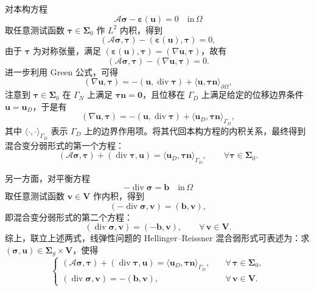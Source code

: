 对本构方程
\[
\mathcal{A}\boldsymbol{\sigma} - \boldsymbol{\varepsilon}(\boldsymbol{u}) = 0\quad\text{in}\,\Omega
\]
取任意测试函数 $\boldsymbol{\tau}\in\boldsymbol{\Sigma}_0$ 作 $L^2$ 内积，得到
\[
(\mathcal{A}\boldsymbol{\sigma},\boldsymbol{\tau}) - (\boldsymbol{\varepsilon}(\boldsymbol{u}),\boldsymbol{\tau}) = 0,
\]
由于 $\boldsymbol{\tau}$ 为对称张量，满足 $(\boldsymbol{\varepsilon}(\boldsymbol{u}),\boldsymbol{\tau}) = (\nabla\boldsymbol{u},\boldsymbol{\tau})$，故有
\[
(\mathcal{A}\boldsymbol{\sigma},\boldsymbol{\tau}) - (\nabla\boldsymbol{u},\boldsymbol{\tau}) = 0.
\]
进一步利用 Green 公式，可得
\[
(\nabla\boldsymbol{u},\boldsymbol{\tau}) = -(\boldsymbol{u},\operatorname{div}\boldsymbol{\tau}) + \langle\boldsymbol{u},\boldsymbol{\tau}\boldsymbol{n}\rangle_{\partial\Omega},
\]
注意到 $\boldsymbol{\tau}\in\boldsymbol{\Sigma}_{0}$ 在 $\Gamma_{N}$ 上满足 $\boldsymbol{\tau}\boldsymbol{n} = \boldsymbol{0}$，且位移在 $\Gamma_D$ 上满足给定的位移边界条件 $\boldsymbol{u} = \boldsymbol{u}_{D}$，于是有
\[
(\nabla\boldsymbol{u},\boldsymbol{\tau}) =-(\boldsymbol{u},\operatorname{div}\boldsymbol{\tau}) +\langle\boldsymbol{u}_D,\boldsymbol{\tau}\boldsymbol{n}\rangle_{\Gamma_D},
\]
其中 $\langle\cdot,\cdot\rangle_{\Gamma_D}$ 表示 $\Gamma_D$ 上的边界作用项。将其代回本构方程的内积关系，最终得到混合变分弱形式的第一个方程：
\[
(\mathcal{A}\boldsymbol{\sigma},\boldsymbol{\tau}) + (\operatorname{div}\boldsymbol{\tau}, \boldsymbol{u}) = \langle\boldsymbol{u}_D,\boldsymbol{\tau}\boldsymbol{n}\rangle_{\Gamma_D},\qquad\forall\boldsymbol{\tau}\in\boldsymbol{\Sigma}_0.
\]

另一方面，对平衡方程
\[
-\operatorname{div}\boldsymbol{\sigma} = \boldsymbol{b}\quad\text{in}\,\Omega
\]
取任意测试函数 $\boldsymbol{v}\in\boldsymbol{V}$ 作内积，得到
\[
(-\operatorname{div}\boldsymbol{\sigma},\boldsymbol{v}) = (\boldsymbol{b},\boldsymbol{v}),
\]
即混合变分弱形式的第二个方程：
\[
(\operatorname{div}\boldsymbol{\sigma},\boldsymbol{v}) =(-\boldsymbol{b},\boldsymbol{v}), \qquad\forall\,\boldsymbol{v}\in\boldsymbol{V}.
\]
综上，联立上述两式，线弹性问题的 Hellinger–Reissner 混合弱形式可表述为：求 $(\boldsymbol{\sigma},\boldsymbol{u})\in\boldsymbol{\Sigma}_g\times\boldsymbol{V}$，使得
\begin{equation} \label{eq:ch5_hr_weak_form}
	\begin{cases} 
		(\mathcal{A}\boldsymbol{\sigma},\boldsymbol{\tau}) + (\operatorname{div}\boldsymbol{\tau}, \boldsymbol{u}) =\langle\boldsymbol{u}_D,\boldsymbol{\tau}\boldsymbol{n}\rangle_{\Gamma_D}, &\quad \forall\,\boldsymbol{\tau}\in\boldsymbol{\Sigma}_0,\\[0.4em] 
		(\operatorname{div}\boldsymbol{\sigma},\boldsymbol{v}) = -(\boldsymbol{b},\boldsymbol{v}), &\quad \forall\,\boldsymbol{v}\in\boldsymbol{V}. 
	\end{cases}
\end{equation}

